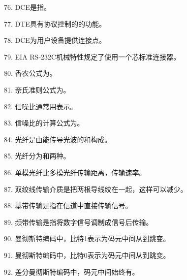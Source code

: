 76. DCE是指\underline{\hspace{4cm}}。

77. DTE具有协议控制的\underline{\hspace{2cm}}的功能。

78. DCE为用户设备提供\underline{\hspace{2cm}}连接点。

79. EIA RS-232C机械特性规定了使用一个\underline{\hspace{2cm}}芯标准连接器。

80. 香农公式为\underline{\hspace{6cm}}。

81. 奈氏准则公式为\underline{\hspace{6cm}}。

82. 信噪比通常用\underline{\hspace{2cm}}表示。

83. 信噪比的计算公式为\underline{\hspace{4cm}}。

84. 光纤是由能传导光波的\underline{\hspace{2cm}}和\underline{\hspace{2cm}}构成。

85. 光纤分为\underline{\hspace{2cm}}和\underline{\hspace{2cm}}两种。

86. 单模光纤比多模光纤传输距离\underline{\hspace{2cm}}，传输速率\underline{\hspace{2cm}}。

87. 双绞线传输介质是把两根导线绞在一起，这样可以减少\underline{\hspace{4cm}}。

88. 基带传输是指在信道中直接传输\underline{\hspace{2cm}}信号。

89. 频带传输是指将数字信号调制成\underline{\hspace{2cm}}信号后传输。

90. 曼彻斯特编码中，比特1表示为码元中间从\underline{\hspace{2cm}}到\underline{\hspace{2cm}}跳变。

91. 曼彻斯特编码中，比特0表示为码元中间从\underline{\hspace{2cm}}到\underline{\hspace{2cm}}跳变。

92. 差分曼彻斯特编码中，码元中间始终有\underline{\hspace{2cm}}。

